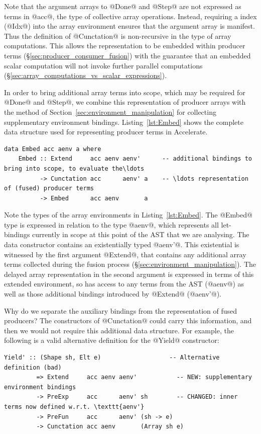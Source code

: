 Note that the argument arrays to @Done@ and @Step@ are not expressed as terms in
@acc@, the type of collective array operations. Instead, requiring a  index (@Idx@) into the array environment ensures that the argument array
is manifest. Thus the definition of @Cunctation@ is non-recursive in the type of
array computations. This allows the representation to be embedded within
producer terms (\S\ref{sec:producer_consumer_fusion}) with the guarantee that an
embedded scalar computation will not invoke further parallel computations
(\S\ref{sec:array_computations_vs_scalar_expressions}).

In order to bring additional array terms into scope, which may be required for
@Done@ and @Step@, we combine this representation of producer arrays with the
method of Section~\ref{sec:environment_manipulation} for collecting
supplementary environment bindings. Listing~\ref{lst:Embed} shows the complete
data structure used for representing producer terms in Accelerate.
%
\begin{lstlisting}[style=haskell_float
    ,label=lst:Embed
    ,caption={Representation of fused producer arrays}]
data Embed acc aenv a where
    Embed :: Extend     acc aenv aenv'      -- additional bindings to bring into scope, to evaluate the\ldots
          -> Cunctation acc      aenv' a    -- \ldots representation of (fused) producer terms
          -> Embed      acc aenv       a
\end{lstlisting}

Note the types of the array environments in Listing~\ref{lst:Embed}. The @Embed@
type is expressed in relation to the type @aenv@, which represents all
let-bindings currently in scope at this point of the AST that we are analysing.
The data constructor contains an existentially typed @aenv'@. This existential
is witnessed by the first argument @Extend@, that contains any additional array
terms collected during the fusion process
(\S\ref{sec:environment_manipulation}). The delayed array representation in the
second argument is expressed in terms of this extended environment, so has
access to any terms from the AST (@aenv@) as well as those additional bindings
introduced by @Extend@ (@aenv'@).

Why do we separate the auxiliary bindings from the representation of fused
producers? The constructors of @Cunctation@ could carry this information,
and then we would not require this additional data structure. For example, the
following is a valid alternative definition for the @Yield@ constructor:
%
\begin{lstlisting}[style=haskell]
  Yield' :: (Shape sh, Elt e)                   -- Alternative definition (bad)
         => Extend     acc aenv aenv'           -- NEW: supplementary environment bindings
         -> PreExp     acc      aenv' sh        -- CHANGED: inner terms now defined w.r.t. \texttt{aenv'}
         -> PreFun     acc      aenv' (sh -> e)
         -> Cunctation acc aenv       (Array sh e)
\end{lstlisting}

